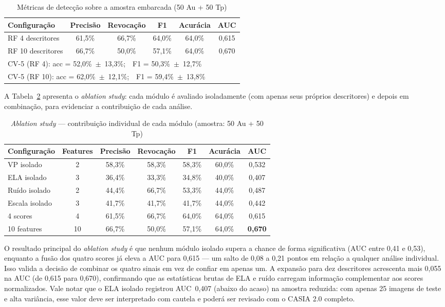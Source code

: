 \documentclass[12pt]{article}
\begin{document}
\begin{table}[ht]
\centering
\caption{Métricas de detecção sobre a amostra embarcada (50 Au + 50 Tp)}
\label{tab:deteccao}
\begin{tabular}{lccccc}
\toprule
\textbf{Configuração} & \textbf{Precisão} & \textbf{Revocação} & \textbf{F1} & \textbf{Acurácia} & \textbf{AUC} \\
\midrule
RF 4 descritores  & 61,5\% & 66,7\% & 64,0\% & 64,0\% & 0,615 \\
RF 10 descritores & 66,7\% & 50,0\% & 57,1\% & 64,0\% & 0,670 \\
\bottomrule
\multicolumn{6}{l}{\small CV-5 (RF 4): acc = 52,0\%~$\pm$~13,3\%;~~F1 = 50,3\%~$\pm$~12,7\%} \\
\multicolumn{6}{l}{\small CV-5 (RF 10): acc = 62,0\%~$\pm$~12,1\%;~~F1 = 59,4\%~$\pm$~13,8\%} \\
\end{tabular}
\end{table}

A Tabela~\ref{tab:ablation} apresenta o \textit{ablation study}: cada módulo é
avaliado isoladamente (com apenas seus próprios descritores) e depois em
combinação, para evidenciar a contribuição de cada análise.

\begin{table}[ht]
\centering
\caption{\textit{Ablation study} — contribuição individual de cada módulo (amostra: 50 Au + 50 Tp)}
\label{tab:ablation}
\begin{tabular}{lcccccc}
\toprule
\textbf{Configuração} & \textbf{Features} & \textbf{Precisão} & \textbf{Revocação} & \textbf{F1} & \textbf{Acurácia} & \textbf{AUC} \\
\midrule
VP isolado     & 2  & 58,3\% & 58,3\% & 58,3\% & 60,0\% & 0,532 \\
ELA isolado    & 3  & 36,4\% & 33,3\% & 34,8\% & 40,0\% & 0,407 \\
Ruído isolado  & 2  & 44,4\% & 66,7\% & 53,3\% & 44,0\% & 0,487 \\
Escala isolado & 3  & 41,7\% & 41,7\% & 41,7\% & 44,0\% & 0,442 \\
\midrule
4 scores       & 4  & 61,5\% & 66,7\% & 64,0\% & 64,0\% & 0,615 \\
10 features    & 10 & 66,7\% & 50,0\% & 57,1\% & 64,0\% & \textbf{0,670} \\
\bottomrule
\end{tabular}
\end{table}

O resultado principal do \textit{ablation study} é que nenhum módulo isolado
supera a chance de forma significativa (AUC entre 0,41 e 0,53), enquanto a
fusão dos quatro scores já eleva a AUC para 0,615 --- um salto de 0,08 a 0,21
pontos em relação a qualquer análise individual. Isso valida a decisão de
combinar os quatro sinais em vez de confiar em apenas um. A expansão para dez
descritores acrescenta mais 0,055 na AUC (de 0,615 para 0,670), confirmando que
as estatísticas brutas de ELA e ruído carregam informação complementar aos scores
normalizados. Vale notar que o ELA isolado registrou AUC~0,407 (abaixo do acaso)
na amostra reduzida: com apenas 25 imagens de teste e alta variância, esse valor
deve ser interpretado com cautela e poderá ser revisado com o CASIA 2.0 completo.
\end{document}
